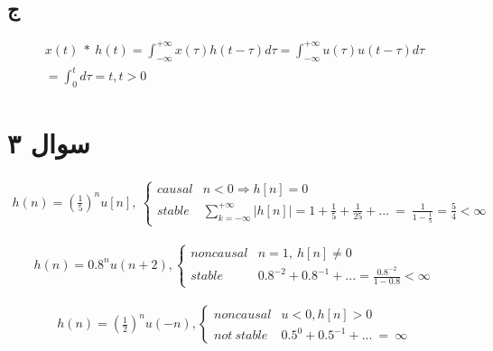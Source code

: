 \documentclass{article}[12pt]
\begin{document}
\subsection{ج}
\begin{equation}
	\begin{gathered}
			x( t) \ *\ h( t) =\int _{-\infty }^{+\infty } x( \tau ) h( t-\tau ) d\tau =\int _{-\infty }^{+\infty } u( \tau ) u( t-\tau ) d\tau \\
			=\int _{0}^{t} d\tau =t,t >0
	\end{gathered}
\end{equation}


\section{سوال ۳}

\begin{equation}
	\begin{gathered}
		h( n) =\left(\frac{1}{5}\right)^{n} u[ n] ,\ \begin{cases}
			causal & n< 0\Longrightarrow h[ n] =0\\
			stable & \sum _{k=-\infty }^{+\infty } |h[ n] |=1+\frac{1}{5} +\frac{1}{25} +...\ =\ \frac{1}{1-\frac{1}{5}} =\frac{5}{4} < \infty 
		\end{cases}
	\end{gathered}
\end{equation}

\begin{equation}
	\begin{gathered}
		h( n) =0.8^{n} u( n+2) ,\begin{cases}
			noncausal & n=1,\ h[ n] \neq 0\\
			stable & 0.8^{-2} +0.8^{-1} +...=\frac{0.8^{-2}}{1-0.8} < \infty 
		\end{cases}
	\end{gathered}
\end{equation}

\begin{equation}
	\begin{gathered}
		h( n) =\left(\frac{1}{2}\right)^{n} u( -n) ,\begin{cases}
			noncausal & u< 0,h[ n]  >0\\
			not\ stable & 0.5^{0} +0.5^{-1} +...\ =\ \infty 
		\end{cases}
	\end{gathered}
\end{equation}
\end{document}

